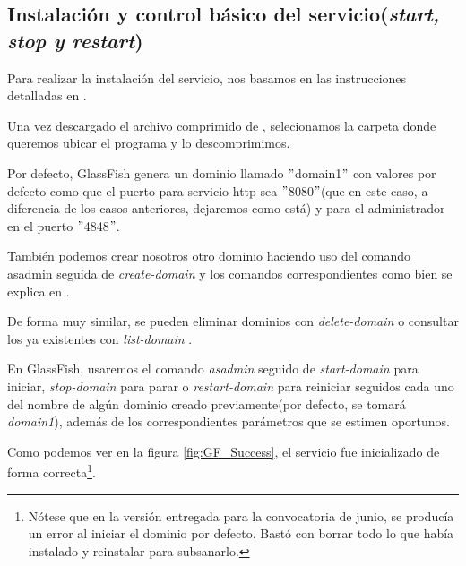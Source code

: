 \documentclass[a4paper, 10pt]{article}
\begin{document}
	\subsection{Instalación y control básico del servicio(\textit{start, stop y restart})}
		Para realizar la instalación del servicio, nos basamos en las instrucciones detalladas
		en \cite{GF_install}.
		
		Una vez descargado el archivo comprimido de \cite{GF_download}, selecionamos la carpeta
		donde queremos ubicar el programa y lo descomprimimos.
		
		Por defecto, GlassFish genera un dominio llamado $"$domain1$"$ con valores por defecto
		como que el puerto para servicio http sea $"$8080$"$(que en este caso, a diferencia de
		los casos anteriores, dejaremos como está) y para el administrador en el puerto $"$4848$"$.
		
		También podemos crear nosotros otro dominio haciendo uso del comando asadmin seguida de
		\textit{create-domain} y los comandos correspondientes como bien se explica en \cite{GF_create}.
		
		De forma muy similar, se pueden eliminar dominios con \textit{delete-domain} \cite{GF_delete}
		o consultar los ya existentes con \textit{list-domain} \cite{GF_list}.
		
		En GlassFish, usaremos el comando \textit{asadmin} seguido de \textit{start-domain}
		\cite{GF_start} para iniciar, \textit{stop-domain} \cite{GF_stop} para parar o
		\textit{restart-domain} \cite{GF_restart} para reiniciar seguidos cada uno del nombre de
		algún dominio creado previamente(por defecto, se tomará \textit{domain1}), además de los
		correspondientes parámetros que se estimen oportunos.
		
		Como podemos ver en la figura \ref{fig:GF_Success}, el servicio fue inicializado de forma
		correcta\footnote{Nótese que en la versión entregada para la convocatoria de junio, se
		producía un error al iniciar el dominio por defecto. Bastó con borrar todo lo que había
		instalado y reinstalar para subsanarlo.}.
\end{document}
